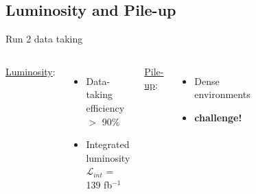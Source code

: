 \subsection{Luminosity and Pile-up}
\begin{frame}{Run 2 data taking}
    
\begin{columns}
\textcolor{HHred}{\underline{Luminosity}}:
\begin{itemize}
    \item Data-taking efficiency $>$ 90\%
    \item Integrated luminosity \\ $\mathcal{L}_{int}$ = 139 fb$^{-1}$
\end{itemize}
\textcolor{HHblue}{\underline{Pile-up}}:
\begin{itemize}
    \item Dense environments 
    \item \textbf{challenge!}
\end{itemize}

\begin{figure}
    \centering
\end{figure}

\begin{figure}
    \centering
\end{figure}


\end{columns}
\end{frame}

